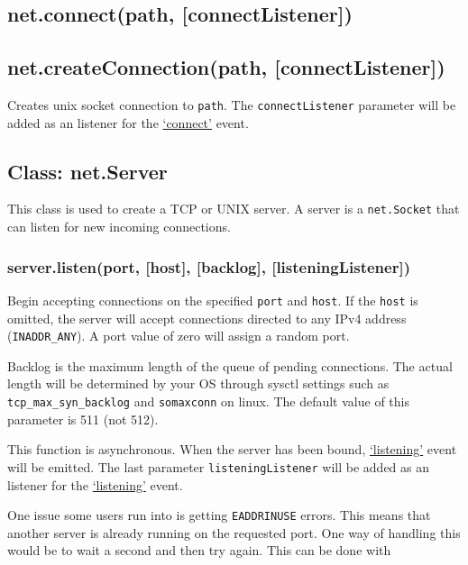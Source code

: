 \subsection{net.connect(path, {[}connectListener{]})}

\subsection{net.createConnection(path, {[}connectListener{]})}

Creates unix socket connection to \texttt{path}. The
\texttt{connectListener} parameter will be added as an listener for the
\hyperref[net\_event\_connect]{`connect'} event.

\subsection{Class: net.Server}

This class is used to create a TCP or UNIX server. A server is a
\texttt{net.Socket} that can listen for new incoming connections.

\subsubsection{server.listen(port, {[}host{]}, {[}backlog{]},
{[}listeningListener{]})}

Begin accepting connections on the specified \texttt{port} and
\texttt{host}. If the \texttt{host} is omitted, the server will accept
connections directed to any IPv4 address (\texttt{INADDR\_ANY}). A port
value of zero will assign a random port.

Backlog is the maximum length of the queue of pending connections. The
actual length will be determined by your OS through sysctl settings such
as \texttt{tcp\_max\_syn\_backlog} and \texttt{somaxconn} on linux. The
default value of this parameter is 511 (not 512).

This function is asynchronous. When the server has been bound,
\hyperref[net\_event\_listening]{`listening'} event will be emitted. The
last parameter \texttt{listeningListener} will be added as an listener
for the \hyperref[net\_event\_listening]{`listening'} event.

One issue some users run into is getting \texttt{EADDRINUSE} errors.
This means that another server is already running on the requested port.
One way of handling this would be to wait a second and then try again.
This can be done with

